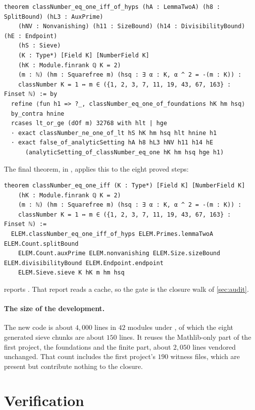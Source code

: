 \documentclass[11pt]{article}
\theoremstyle{definition}
\begin{document}
\begin{lstlisting}
theorem classNumber_eq_one_iff_of_hyps (hA : LemmaTwoA) (h8 : SplitBound) (hL3 : AuxPrime)
    (hNV : Nonvanishing) (h11 : SizeBound) (h14 : DivisibilityBound) (hE : Endpoint)
    (hS : Sieve)
    (K : Type*) [Field K] [NumberField K]
    (hK : Module.finrank ℚ K = 2)
    (m : ℕ) (hm : Squarefree m) (hsq : ∃ α : K, α ^ 2 = -(m : K)) :
    classNumber K = 1 ↔ m ∈ ({1, 2, 3, 7, 11, 19, 43, 67, 163} : Finset ℕ) := by
  refine ⟨fun h1 => ?_, classNumber_eq_one_of_foundations hK hm hsq⟩
  by_contra hnine
  rcases lt_or_ge (dOf m) 32768 with hlt | hge
  · exact classNumber_ne_one_of_lt hS hK hm hsq hlt hnine h1
  · exact false_of_analyticSetting hA h8 hL3 hNV h11 h14 hE
      (analyticSetting_of_classNumber_eq_one hK hm hsq hge h1)
\end{lstlisting}

\noindent The final theorem, in , applies this to the eight proved steps:
\begin{lstlisting}
theorem classNumber_eq_one_iff (K : Type*) [Field K] [NumberField K]
    (hK : Module.finrank ℚ K = 2)
    (m : ℕ) (hm : Squarefree m) (hsq : ∃ α : K, α ^ 2 = -(m : K)) :
    classNumber K = 1 ↔ m ∈ ({1, 2, 3, 7, 11, 19, 43, 67, 163} : Finset ℕ) :=
  ELEM.classNumber_eq_one_iff_of_hyps ELEM.Primes.lemmaTwoA ELEM.Count.splitBound
    ELEM.Count.auxPrime ELEM.nonvanishing ELEM.Size.sizeBound ELEM.divisibilityBound ELEM.Endpoint.endpoint
    ELEM.Sieve.sieve K hK m hm hsq
\end{lstlisting}
 reports . That report reads a cache, so the gate is the closure walk of \cref{sec:audit}.

\paragraph{The size of the development.} The new code is about $4{,}000$ lines in $42$ modules under , of which the eight generated sieve chunks are about $150$ lines. It reuses the Mathlib-only part of the first project, the foundations and the finite part, about $2{,}050$ lines vendored unchanged. That count includes the first project's $190$ witness files, which are present but contribute nothing to the closure.

\section{Verification}\label{sec:verification}
\end{document}
